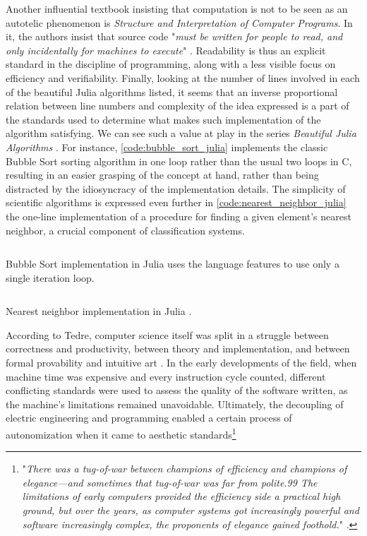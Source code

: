 Another influential textbook insisting that computation is not to be seen as an autotelic phenomenon is \emph{Structure and Interpretation of Computer Programs}. In it, the authors insist that source code "\emph{must be written for people to read, and only incidentally for machines to execute}" \citep{abelson_structure_1979}. Readability is thus an explicit standard in the discipline of programming, along with a less visible focus on efficiency and verifiability. Finally, looking at the number of lines involved in each of the beautiful Julia algorithms listed, it seems that an inverse proportional relation between line numbers and complexity of the idea expressed is a part of the standards used to determine what makes such implementation of the algorithm satisfying. We can see such a value at play in the series \emph{Beautiful Julia Algorithms} \citep{moss_beautifulalgorithms_2022}. For instance, \autoref{code:bubble_sort_julia} implements the classic Bubble Sort sorting algorithm in one loop rather than the usual two loops in C, resulting in an easier grasping of the concept at hand, rather than being distracted by the idiosyncracy of the implementation details. The simplicity of scientific algorithms is expressed even further in \autoref{code:nearest_neighbor_julia} the one-line implementation of a procedure for finding a given element's nearest neighbor, a crucial component of classification systems.

\begin{listing}
  \inputminted{julia}{./corpus/bubblesort.jl}
  \caption{Bubble Sort implementation in Julia uses the language features to use only a single iteration loop. \citep{moss_bubblesort_2021}}
  \label{code:bubble_sort_julia}
\end{listing}

\begin{listing}
  \inputminted{julia}{./corpus/nearest_neighbor.jl}
  \caption{Nearest neighbor implementation in Julia \citep{moss_nearestneighbors_2021}.}
  \label{code:nearest_neighbor_julia}
\end{listing}

According to Tedre, computer science itself was split in a struggle between correctness and productivity, between theory and implementation, and between formal provability and intuitive art \citep{tedre_science_2014}. In the early developments of the field, when machine time was expensive and every instruction cycle counted, different conflicting standards were used to assess the quality of the software written, as the machine's limitations remained unavoidable. Ultimately, the decoupling of electric engineering and programming enabled a certain process of autonomization when it came to aesthetic standards\footnote{"\emph{There was a tug-of-war between champions of efficiency and champions of elegance—and sometimes that tug-of-war was far from polite.99 The limitations of early computers provided the efficiency side a practical high ground, but over the years, as computer systems got increasingly powerful and software increasingly complex, the proponents of elegance gained foothold.}" \citep{tedre_science_2014}.}

